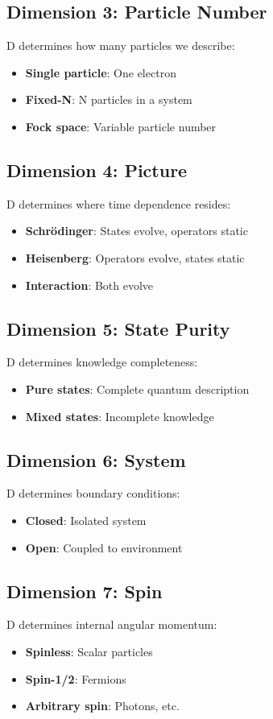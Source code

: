 \documentclass[12pt,oneside]{book}
\begin{document}
\subsection{Dimension 3: Particle Number}
D determines how many particles we describe:
\begin{itemize}
  \item \textbf{Single particle}: One electron
  \item \textbf{Fixed-N}: N particles in a system
  \item \textbf{Fock space}: Variable particle number
\end{itemize}

\subsection{Dimension 4: Picture}
D determines where time dependence resides:
\begin{itemize}
  \item \textbf{Schrödinger}: States evolve, operators static
  \item \textbf{Heisenberg}: Operators evolve, states static
  \item \textbf{Interaction}: Both evolve
\end{itemize}

\subsection{Dimension 5: State Purity}
D determines knowledge completeness:
\begin{itemize}
  \item \textbf{Pure states}: Complete quantum description
  \item \textbf{Mixed states}: Incomplete knowledge
\end{itemize}

\subsection{Dimension 6: System}
D determines boundary conditions:
\begin{itemize}
  \item \textbf{Closed}: Isolated system
  \item \textbf{Open}: Coupled to environment
\end{itemize}

\subsection{Dimension 7: Spin}
D determines internal angular momentum:
\begin{itemize}
  \item \textbf{Spinless}: Scalar particles
  \item \textbf{Spin-1/2}: Fermions
  \item \textbf{Arbitrary spin}: Photons, etc.
\end{itemize}
\end{document}
